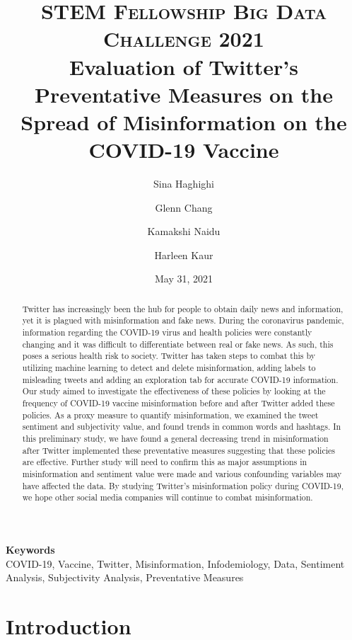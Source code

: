 \documentclass[10pt,twocolumn,letterpaper]{article}
\title{
		\usefont{OT1}{bch}{b}{n}
		\normalfont \normalsize \textsc{STEM Fellowship Big Data Challenge 2021} \\ [10pt]
		\huge Evaluation of Twitter's Preventative Measures on the Spread of Misinformation on the COVID-19 Vaccine
 \\
}
\author[1]{Sina Haghighi}
\author[2]{Glenn Chang}
\author[3]{Kamakshi Naidu}
\author[1]{Harleen Kaur}
\affil[1]{Simon Fraser University}
\affil[2]{University of Toronto}
\affil[3]{University of Western Ontario}
\begin{document}
\date{May 31, 2021}
\maketitle

\begin{abstract}
Twitter has increasingly been the hub for people to obtain daily news and information, yet it is plagued with misinformation and fake news. During the coronavirus pandemic, information regarding the COVID-19 virus and health policies were constantly changing and it was difficult to differentiate between real or fake news. As such, this poses a serious health risk to society. Twitter has taken steps to combat this by utilizing machine learning to detect and delete misinformation, adding labels to misleading tweets and adding an exploration tab for accurate COVID-19 information. Our study aimed to investigate the effectiveness of these policies by looking at the frequency of COVID-19 vaccine misinformation before and after Twitter added these policies. As a proxy measure to quantify misinformation, we examined the tweet sentiment and subjectivity value, and found trends in common words and hashtags. In this preliminary study, we have found a general decreasing trend in misinformation after Twitter implemented these preventative measures suggesting that these policies are effective. Further study will need to confirm this as major assumptions in misinformation and sentiment value were made and various confounding variables may have affected the data. By studying Twitter’s misinformation policy during COVID-19, we hope other social media companies will continue to combat misinformation. 


\end{abstract} 

{\textbf{Keywords} \\
COVID-19, Vaccine, Twitter, Misinformation, Infodemiology, Data, Sentiment Analysis, Subjectivity Analysis, Preventative Measures}

\section{Introduction}
\end{document}
